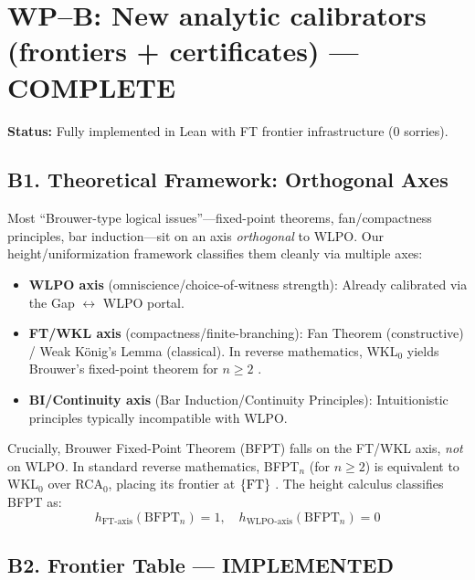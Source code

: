 \documentclass[11pt]{article}
\theoremstyle{definition}
\theoremstyle{remark}
\begin{document}
\section{WP–B: New analytic calibrators (frontiers + certificates) — \textbf{\color{green}COMPLETE}}

\textbf{Status:} Fully implemented in Lean with FT frontier infrastructure (0 sorries).

\subsection{B1. Theoretical Framework: Orthogonal Axes}

Most ``Brouwer-type logical issues''—fixed-point theorems, fan/compactness principles, bar induction—sit on an axis \emph{orthogonal} to WLPO. Our height/uniformization framework classifies them cleanly via multiple axes:

\begin{itemize}
\item \textbf{WLPO axis} (omniscience/choice-of-witness strength): Already calibrated via the Gap $\leftrightarrow$ WLPO portal.
\item \textbf{FT/WKL axis} (compactness/finite-branching): Fan Theorem (constructive) / Weak König's Lemma (classical). In reverse mathematics, WKL$_0$ yields Brouwer's fixed-point theorem for $n \geq 2$ \cite{Hirst-BFPT}.
\item \textbf{BI/Continuity axis} (Bar Induction/Continuity Principles): Intuitionistic principles typically incompatible with WLPO.
\end{itemize}

Crucially, Brouwer Fixed-Point Theorem (BFPT) falls on the FT/WKL axis, \emph{not} on WLPO. In standard reverse mathematics, BFPT$_n$ (for $n \geq 2$) is equivalent to WKL$_0$ over RCA$_0$, placing its frontier at $\{\mathrm{FT}\}$ \cite{Shioji-Tanaka}. The height calculus classifies BFPT as:
\[h_{\text{FT-axis}}(\text{BFPT}_n) = 1, \quad h_{\text{WLPO-axis}}(\text{BFPT}_n) = 0\]

\subsection{B2. Frontier Table — \textbf{\color{green}IMPLEMENTED}}
\end{document}
